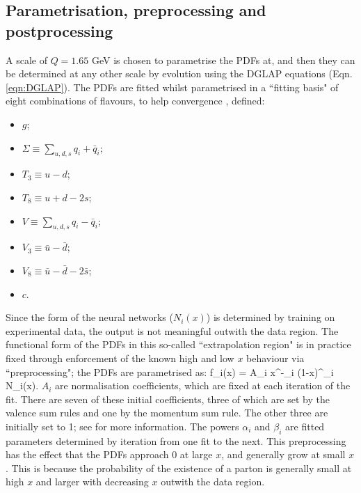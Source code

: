 \subsection{Parametrisation, preprocessing and postprocessing}
A scale of $Q=1.65$ GeV is chosen to parametrise the PDFs at, and then they can be determined at any other scale by evolution using the DGLAP equations (Eqn. \ref{eqn:DGLAP}). The PDFs are fitted whilst parametrised in a ``fitting basis" of eight combinations of flavours, to help convergence \cite{Ball:2014uwa}, defined:
\begin{itemize}
\item $g$;
\item $\Sigma \equiv \sum_{u,d,s} q_i + \bar{q}_i$;
\item $T_3 \equiv u - d$;
\item $T_8 \equiv u + d - 2s$;
\item $V \equiv \sum_{u, d, s} q_i - \bar{q}_i$;
\item $V_3 \equiv \bar{u} - \bar{d}$;
\item $V_8 \equiv \bar{u} - \bar{d} - 2 \bar{s}$;
\item $c$.
\end{itemize}
Since the form of the neural networks ($N_i(x)$) is determined by training on experimental data, the output is not meaningful outwith the data region. The functional form of the PDFs in this so-called ``extrapolation region" is in practice fixed through enforcement of the known high and low $x$ behaviour via ``preprocessing"; the PDFs are parametrised as:
\beq
  f_i(x) = A_i x^{-\alpha_i} (1-x)^{\beta_i} N_i(x).
\eeq
$A_i$ are normalisation coefficients, which are fixed at each iteration of the fit. There are seven of these initial coefficients, three of which are set by the valence sum rules and one by the momentum sum rule. The other three are initially set to 1; see \cite{NNPDF:2014otw} for more information. The powers $\alpha_i$ and $\beta_i$ are fitted parameters determined by iteration from one fit to the next. This preprocessing has the effect that the PDFs approach 0 at large $x$, and generally grow at small $x$. This is because the probability of the existence of a parton is generally small at high $x$ and larger with decreasing $x$ outwith the data region.

